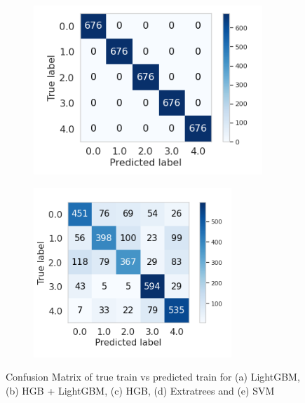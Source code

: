 \begin{figure}[H]
\begin{subfigure}{.55\textwidth}
        \caption{}
        \label{fig:sub3}
    \end{subfigure}%
    \begin{subfigure}{.55\textwidth}
        \setcounter{subfigure}{3} %
        \centering
        \includegraphics[width=.55\linewidth]{figures/xtratrees_train.png}
        \caption{}
        \label{fig:sub4}
    \end{subfigure}   
\end{figure}
\begin{figure}[H]
    \centering
    \ContinuedFloat
     
    \bigskip
    \begin{subfigure}{.55\textwidth}
        \setcounter{subfigure}{4} %
        \centering
        \includegraphics[width=.55\linewidth]{figures/svm_train.png}
        \caption{}
        \label{fig:sub3}
    \end{subfigure}%
    
    \caption{Confusion Matrix of true train vs predicted train for (a) LightGBM, (b) HGB + LightGBM, (c) HGB, (d) Extratrees and (e) SVM}\label{fig:main}
\end{figure}

